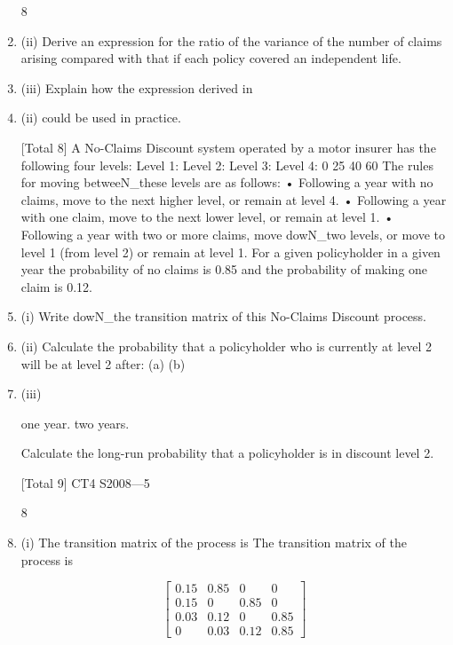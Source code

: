 \documentclass[a4paper,12pt]{article}
\begin{document}
\begin{enumerate}
8
\item (ii) Derive an expression for the ratio of the variance of the number of claims
arising compared with that if each policy covered an independent life.

\item (iii) Explain how the expression derived in \item (ii) could be used in practice.

[Total 8]
A No-Claims Discount system operated by a motor insurer has the following four
levels:
Level 1:
Level 2:
Level 3:
Level 4:
0%
25%
40%
60%
The rules for moving betweeN_these levels are as follows:
• Following a year with no claims, move to the next higher level, or remain at
level 4.
• Following a year with one claim, move to the next lower level, or remain at
level 1.
• Following a year with two or more claims, move dowN_two levels, or move to
level 1 (from level 2) or remain at level 1.
For a given policyholder in a given year the probability of no claims is 0.85 and the
probability of making one claim is 0.12.
\item (i) Write dowN_the transition matrix of this No-Claims Discount process.
\item (ii) Calculate the probability that a policyholder who is currently at level 2 will be
at level 2 after:
(a)
(b)
\item (iii)

one year.
two years.

Calculate the long-run probability that a policyholder is in discount level 2.

[Total 9]
CT4 S2008—5

\newpage



8
\item (i)
The transition matrix of the process is
The transition matrix of the process is

\[ \begin{bmatrix}
0.15 & 0.85 & 0 & 0 \\
0.15 & 0 & 0.85 & 0 \\
0.03 & 0.12 & 0 & 0.85 \\
0 & 0.03 & 0.12 & 0.85 
\end{bmatrix}  \]


\end{enumerate}
\end{document}
